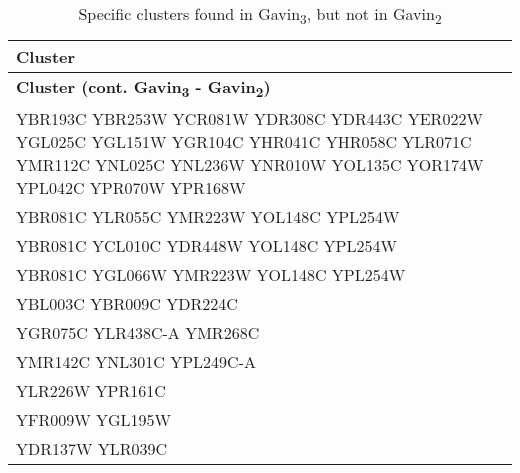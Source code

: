 \setlength{\extrarowheight}{2pt}
\renewcommand{\arraystretch}{1.2}
\begin{longtable}{| m{27em} |}
\caption{Specific clusters found in Gavin\textsubscript{3}, but not in Gavin\textsubscript{2}} \\
\hline
\textbf{Cluster} \\
\hline
\endfirsthead
\hline
\textbf{Cluster (cont. Gavin\textsubscript{3} - Gavin\textsubscript{2})} \\
\hline
\endhead
\hline
\endfoot
\hline
\endlastfoot
YBR193C YBR253W YCR081W YDR308C YDR443C YER022W YGL025C YGL151W YGR104C YHR041C YHR058C YLR071C YMR112C YNL025C YNL236W YNR010W YOL135C YOR174W YPL042C YPR070W YPR168W \\
\hline
YBR081C YLR055C YMR223W YOL148C YPL254W \\
\hline
YBR081C YCL010C YDR448W YOL148C YPL254W \\
\hline
YBR081C YGL066W YMR223W YOL148C YPL254W \\
\hline
YBL003C YBR009C YDR224C \\
\hline
YGR075C YLR438C-A YMR268C \\
\hline
YMR142C YNL301C YPL249C-A \\
\hline
YLR226W YPR161C \\
\hline
YFR009W YGL195W \\
\hline
YDR137W YLR039C \\
\hline
\end{longtable}